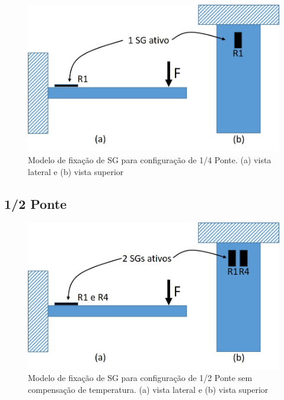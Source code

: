 \documentclass[a4paper]{instrumentacao}
\begin{document}
\begin{figure}[H]
\center
\includegraphics[width=\textwidth]{1-4 ponte.jpg}
\caption{Modelo de fixação de SG para configuração de 1/4 Ponte. (a) vista lateral e (b) vista superior}
\label{fig:1-4 ponte}
\end{figure}


\subsection{1/2 Ponte}

\begin{figure}[H]
\center
\includegraphics[width=\textwidth]{1-2 ponte_1.jpg}
\caption{Modelo de fixação de SG para configuração de 1/2 Ponte sem compensação de temperatura. (a) vista lateral e (b) vista superior}
\label{fig:1-2 ponte_sem temp}
\end{figure}
\end{document}

